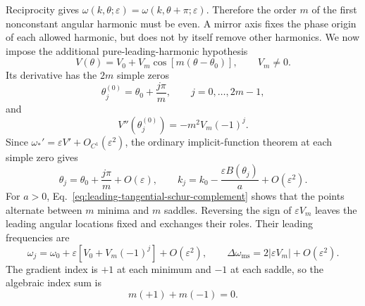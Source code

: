 Reciprocity gives
\(\omega(k,\theta;\varepsilon)
 =\omega(k,\theta+\pi;\varepsilon)\).
Therefore the order \(m\) of the first nonconstant angular harmonic must be
even.  A mirror axis fixes the phase origin of each allowed harmonic, but does
not by itself remove other harmonics.  We now impose the additional
pure-leading-harmonic hypothesis
\begin{equation}
  V(\theta)=V_0+V_m\cos[m(\theta-\theta_0)],
  \qquad V_m\ne0.
  \label{eq:pure-general-even-harmonic}
\end{equation}
Its derivative has the \(2m\) simple zeros
\begin{equation}
  \theta_j^{(0)}=\theta_0+\frac{j\pi}{m},
  \qquad j=0,\ldots,2m-1,
  \label{eq:pure-harmonic-angular-roots}
\end{equation}
and
\begin{equation}
  V''(\theta_j^{(0)})
  =-m^2V_m(-1)^j.
  \label{eq:pure-harmonic-angular-curvature}
\end{equation}
Since
\(
  \omega_*'=\varepsilon V'+O_{C^1}(\varepsilon^2)
\), the ordinary implicit-function theorem at each simple zero gives
\begin{equation}
  \theta_j=\theta_0+\frac{j\pi}{m}+O(\varepsilon),
  \qquad
  k_j=k_0-\frac{\varepsilon B(\theta_j)}{a}
       +O(\varepsilon^2).
  \label{eq:general-harmonic-critical-locations}
\end{equation}
For \(a>0\), Eq.~\eqref{eq:leading-tangential-schur-complement} shows that
the points alternate between \(m\) minima and \(m\) saddles.  Reversing the
sign of \(\varepsilon V_m\) leaves the leading angular locations fixed and
exchanges their roles.  Their leading frequencies are
\begin{equation}
  \omega_j
  =\omega_0+\varepsilon[V_0+V_m(-1)^j]
   +O(\varepsilon^2),
  \qquad
  \Delta\omega_{\mathrm{ms}}
  =2|\varepsilon V_m|+O(\varepsilon^2).
  \label{eq:general-harmonic-frequency-splitting}
\end{equation}
The gradient index is \(+1\) at each minimum and \(-1\) at each saddle, so
the algebraic index sum is
\begin{equation}
  m(+1)+m(-1)=0.
  \label{eq:general-harmonic-index-sum}
\end{equation}

